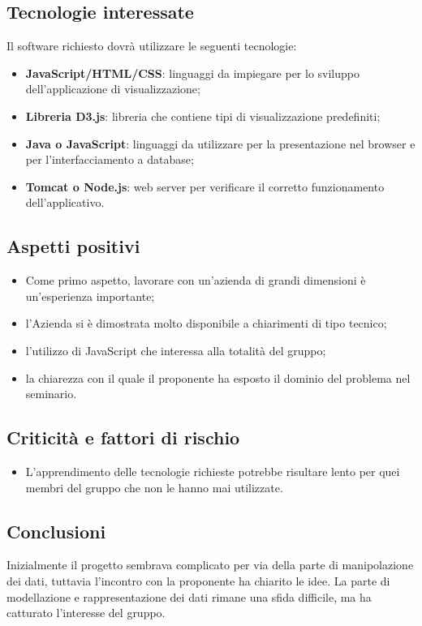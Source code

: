 \subsection{Tecnologie interessate}
Il software richiesto dovrà utilizzare le seguenti tecnologie:
\begin{itemize}
	\item \textbf{JavaScript/HTML/CSS}: linguaggi da impiegare per lo sviluppo dell'applicazione di visualizzazione;
	\item \textbf{Libreria D3.js}: libreria che contiene tipi di visualizzazione predefiniti;
	\item \textbf{Java o JavaScript}: linguaggi da utilizzare per la presentazione nel browser e per l'interfacciamento a database;
	\item \textbf{Tomcat o Node.js}: web server per verificare il corretto funzionamento dell'applicativo.
\end{itemize}
\subsection{Aspetti positivi}
\begin{itemize}
	\item Come primo aspetto, lavorare con un'azienda di grandi dimensioni è un'esperienza importante;
	\item l'Azienda si è dimostrata molto disponibile a chiarimenti di tipo tecnico;
	\item l'utilizzo di JavaScript che interessa alla totalità del gruppo;
	\item la chiarezza con il quale il proponente ha esposto il dominio del problema nel seminario.
\end{itemize}
\subsection{Criticità e fattori di rischio}
\begin{itemize}
	\item L'apprendimento delle tecnologie richieste potrebbe risultare lento per quei membri del gruppo che non le hanno mai utilizzate.
\end{itemize}
\subsection{Conclusioni}
Inizialmente il progetto sembrava complicato per via della parte di manipolazione dei dati, tuttavia l'incontro con la proponente ha chiarito le idee. La parte di modellazione e rappresentazione dei dati rimane una sfida difficile, ma ha catturato l'interesse del gruppo.